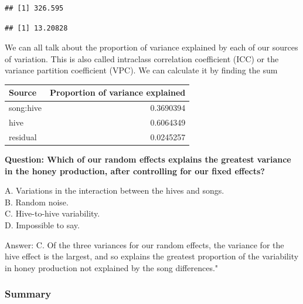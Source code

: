 \documentclass[
  openany]{book}
\newenvironment{Shaded}{\begin{snugshade}}{\end{snugshade}}
\newcommand{\CommentTok}[1]{\textcolor[rgb]{0.56,0.35,0.01}{\textit{#1}}}
\newcommand{\DecValTok}[1]{\textcolor[rgb]{0.00,0.00,0.81}{#1}}
\newcommand{\FunctionTok}[1]{\textcolor[rgb]{0.00,0.00,0.00}{#1}}
\newcommand{\NormalTok}[1]{#1}
\newcommand{\OtherTok}[1]{\textcolor[rgb]{0.56,0.35,0.01}{#1}}
\newcommand{\SpecialCharTok}[1]{\textcolor[rgb]{0.00,0.00,0.00}{#1}}
\begin{document}
\begin{verbatim}
## [1] 326.595
\end{verbatim}

\begin{Shaded}
\end{Shaded}

\begin{verbatim}
## [1] 13.20828
\end{verbatim}

We can all talk about the proportion of variance explained by each of our sources of variation. This is also called intraclass correlation coefficient (ICC) or the variance partition coefficient (VPC). We can calculate it by finding the sum

\begin{tabular}{l|r}
\hline
Source & Proportion of variance explained\\
\hline
song:hive & 0.3690394\\
\hline
hive & 0.6064349\\
\hline
residual & 0.0245257\\
\hline
\end{tabular}

\textbf{Question: Which of our random effects explains the greatest variance in the honey production, after controlling for our fixed effects?}

A. Variations in the interaction between the hives and songs.\\
B. Random noise.\\
C. Hive-to-hive variability.\\
D. Impossible to say.

Answer: C. Of the three variances for our random effects, the variance for the hive effect is the largest, and so explains the greatest proportion of the variability in honey production not explained by the song differences."

\hypertarget{summary-1}{%
\subsubsection{Summary}\label{summary-1}}
\end{document}

